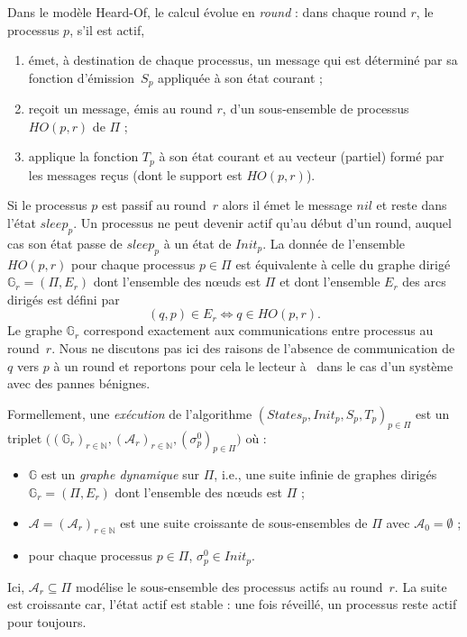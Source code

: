 \documentclass{article}
\begin{document}
Dans le mod\`ele Heard-Of, le calcul \'evolue en \emph{round} : dans chaque round $r$, 
	le processus $p$, s'il est actif,  
	\begin{enumerate}
	\item \'emet, \`a destination de chaque processus, un message qui est d\'etermin\'e par sa fonction d'\'emission~$S_p$  
		appliqu\'ee \`a son \'etat courant ;
	\item re\c{c}oit un message, \'emis au round $r$, d'un sous-ensemble de processus $HO(p,r)$ de $\Pi$ ;
        \item  applique la fonction  $T_p$ \`a son \'etat courant  et au vecteur (partiel) form\'e par les messages re\c{c}us (dont le support est 
         $HO(p,r)$).
	\end{enumerate}
Si le processus $p$ est passif au round~$r$ alors il \'emet le message $nil$ et reste dans l'\'etat $sleep_p$.
Un processus ne peut devenir actif qu'au d\'ebut d'un round, auquel cas son \'etat passe de $sleep_p$ \`a 
	un \'etat de $Init_p$.
La donn\'ee de l'ensemble $HO(p,r)$ pour chaque processus $p \in \Pi$ est \'equivalente \`a celle du graphe dirig\'e
	$\mathds{G}_r = (\Pi, E_r)$ dont l'ensemble des n\oe uds est $\Pi$ et dont l'ensemble $E_r$ des arcs dirig\'es 
	est d\'efini par
	$$ (q,p) \in E_r \Leftrightarrow q \in HO(p,r) .$$	
Le graphe $\mathds{G}_r $ correspond exactement aux communications entre processus au round~$r$.
Nous ne discutons pas ici des raisons de l'absence de communication de $q$ vers $p$ \`a un round et reportons pour cela  le lecteur 
	\`a~\cite{CB09} dans le cas d'un syst\`eme avec des pannes b\'enignes.

Formellement, une \emph{ex\'ecution} de l'algorithme  $(States_p, Init_p, S_p,T_p)_{p\in \Pi}$ est 
	un triplet $\big( (\mathds{G}_r)_{r \in \mathds{N}} ,  (\mathcal{A}_r)_{r \in \mathds{N}} , (\sigma^0_p)_{p \in \Pi} \big)$ où :
	\begin{itemize}
	\item $\mathds{G}$ est un \emph{graphe dynamique} sur $\Pi$, i.e., une suite infinie de graphes dirig\'es 
	$\mathds{G}_r = (\Pi, E_r)$ dont l'ensemble des n\oe uds est $\Pi$ ; 
	\item $\mathcal{A} = (\mathcal{A}_r)_{r \in \mathds{N}}$ est une suite croissante de sous-ensembles de $\Pi$ 
	avec $\mathcal{A}_0 = \emptyset$ ;
	\item pour chaque processus $p\in \Pi$, $\sigma^0_p \in Init_p$.
	\end{itemize}
Ici,  $\mathcal{A}_r \subseteq \Pi$ modélise le sous-ensemble des processus actifs au round~$r$.
La suite est croissante car, l'\'etat actif est stable : une fois r\'eveill\'e, un processus reste actif pour toujours.
\end{document}
